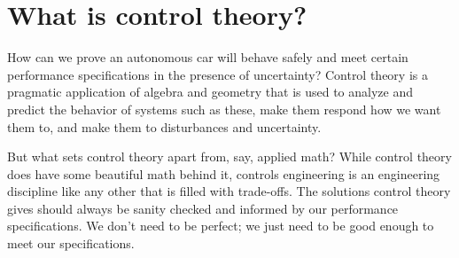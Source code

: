 \section{What is control theory?}

How can we prove an autonomous car will behave safely and meet certain
performance specifications in the presence of uncertainty? Control theory is a
pragmatic application of algebra and geometry that is used to analyze and
predict the behavior of \glspl{system} such as these, make them respond how we
want them to, and make them  to \glspl{disturbance}
and uncertainty.

But what sets control theory apart from, say, applied math? While control theory
does have some beautiful math behind it, controls engineering is an engineering
discipline like any other that is filled with trade-offs. The solutions control
theory gives should always be sanity checked and informed by our performance
specifications. We don't need to be perfect; we just need to be good enough to
meet our specifications.
